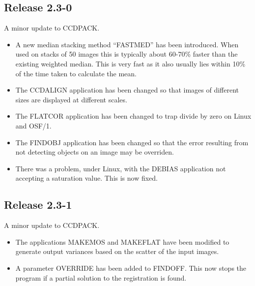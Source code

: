 \documentclass[twoside,11pt]{article}
\newcommand{\htmlref}[2]{#1}
\renewcommand{\_}{\texttt{\symbol{95}}}
\newcommand{\xroutine}[1]{\htmlref{{\sc #1}}{#1}}
\begin{document}
\subsection{Release 2.3-0}
A minor update to CCDPACK.
\begin{itemize}
  \item A new median stacking method ``FASTMED'' has been introduced. When
  used on stacks of 50 images this is typically about 60-70\% faster
  than the existing weighted median. This is very fast as it also
  usually lies within 10\% of the time taken to calculate the mean.

\item  The \xroutine{CCDALIGN} application has been changed so that images of
  different sizes are displayed at different scales.

\item  The \xroutine{FLATCOR} application has been changed to trap 
  divide by zero on Linux and OSF/1.

\item  The \xroutine{FINDOBJ} application has been changed so that the
  error resulting from not detecting objects on an image may be
  overriden. 

\item There was a problem, under Linux, with the \xroutine{DEBIAS} 
      application not accepting a saturation value. This is now fixed.
\end{itemize}

\subsection{Release 2.3-1}
A minor update to CCDPACK.
\begin{itemize}
\item The applications \xroutine{MAKEMOS} and \xroutine{MAKEFLAT} have
  been modified to generate output variances based on the scatter of
  the input images.
\item A parameter OVERRIDE has been added to \xroutine{FINDOFF}. This
  now stops the program if a partial solution to the registration is
  found.
\end{itemize}
\end{document}
